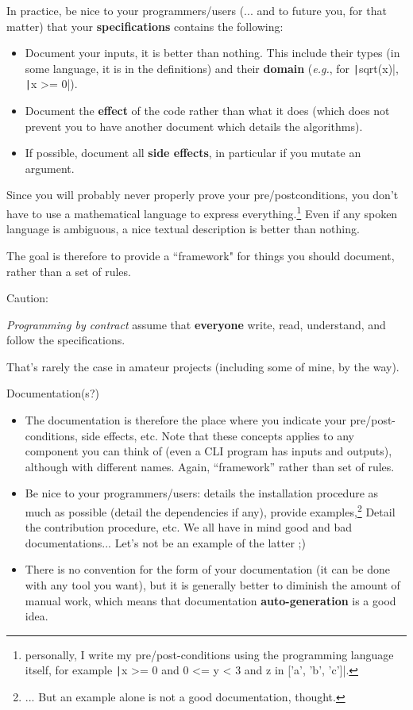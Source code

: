 \documentclass[10pt,
aspectratio=169
]{beamer}
\begin{document}
\begin{frame}
	In practice, be nice to your programmers/users (... and to future you, for that matter) that your \textbf{specifications} contains the following:\begin{itemize}
		\item Document your inputs, it is better than nothing. This include their types (in some language, it is in the definitions) and their \textbf{domain} (\textit{e.g.}, for \texttt|sqrt(x)|, \texttt|x >= 0|).
		\item Document the \textbf{effect} of the code rather than what it does (which does not prevent you to have another document which details the algorithms).
		\item If possible, document all \textbf{side effects}, in particular if you mutate an argument.
	\end{itemize}
	
	Since you will probably never properly prove your pre/postconditions, you don't have to use a mathematical language to express everything.\footnote{personally, I write my pre/post-conditions using the programming language itself, for example \texttt|x >= 0 and 0 <= y < 3 and z in ['a', 'b', 'c']|.} Even if any spoken language is ambiguous, a nice textual description is better than nothing.
	
	The goal is therefore to provide a ``framework" for things you should document, rather than a set of rules.
\end{frame}

\begin{frame}
	Caution:
\begin{center}
	{\LARGE \textit{Programming by contract} assume that \textbf{everyone} write, read, understand, and follow the specifications.}
\end{center}
That's rarely the case in amateur projects (including some of mine, by the way).
\end{frame}

\begin{frame}{Documentation(s?)}
	\begin{itemize}
		\item The documentation is therefore the place where you indicate your pre/post-conditions, side effects, etc. Note that these concepts applies to any component you can think of (even a CLI program has inputs and outputs), although with different names. Again, ``framework'' rather than set of rules.
		\item Be nice to your programmers/users: details the installation procedure as much as possible (detail the dependencies if any), provide examples,\footnote{... But an example alone is not a good documentation, thought.} Detail the contribution procedure, etc. We all have in mind good and bad documentations... Let's not be an example of the latter ;)
		\item There is no convention for the form of your documentation (it can be done with any tool you want), but it is generally better to diminish the amount of manual work, which means that documentation \textbf{auto-generation} is a good idea.
	\end{itemize}
\end{frame}
\end{document}
